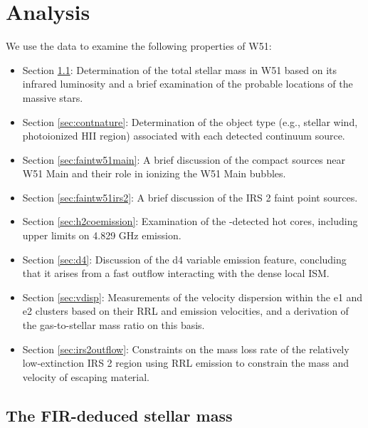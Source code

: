 \section{Analysis}
\label{sec:analysis}
We use the data to examine the following properties of W51:
\begin{itemize}
    \item Section \ref{sec:stellarmass}: Determination of the total stellar
        mass in W51 based on its infrared luminosity and a brief examination
        of the probable locations of the massive stars.
    \item Section \ref{sec:contnature}: Determination of the object type
        (e.g., stellar wind, photoionized HII region) associated with each
        detected continuum source.
    \item Section \ref{sec:faintw51main}: A brief discussion of the compact
        sources near W51 Main and their role in ionizing the W51 Main bubbles.
    \item Section \ref{sec:faintw51irs2}: A brief discussion of the IRS 2 faint
        point sources.
    \item Section \ref{sec:h2coemission}: Examination of the \ortho
        \twotwo-detected hot cores, including upper limits on 4.829 GHz \ortho
        \oneone emission.
    \item Section \ref{sec:d4}: Discussion of the d4 variable emission
        feature, concluding that it arises from a fast outflow interacting with
        the dense local ISM.
    \item Section \ref{sec:vdisp}: Measurements of the velocity dispersion
        within the e1 and e2 clusters based on their RRL and \formaldehyde
        emission velocities, and a derivation of the gas-to-stellar mass ratio
        on this basis.
    \item Section \ref{sec:irs2outflow}: Constraints on the mass loss rate of the
        relatively low-extinction IRS 2 region using RRL emission to constrain
        the mass and velocity of escaping material.
\end{itemize}

\subsection{The FIR-deduced stellar mass}
\label{sec:stellarmass}

